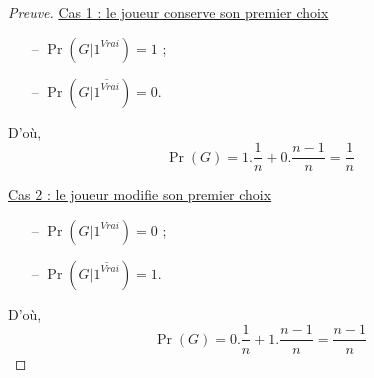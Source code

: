 \begin{proof}[Preuve]
\underline{Cas 1 : le joueur conserve son premier choix}
\begin{itemize}
\item[--] $\Pr(G|1^{Vrai}) = 1 $ ;
\item[--] $\Pr(G|\overline{1^{Vrai}}) = 0$.
\end{itemize}
D'où, 
$$ \Pr(G) = 1.\frac{1}{n}
	+ 0.\frac{n-1}{n} = \frac{1}{n}$$

\underline{Cas 2 : le joueur modifie son premier choix}
\begin{itemize}
\item[--] $\Pr(G|1^{Vrai}) = 0$ ;
\item[--] $\Pr(G|\overline{1^{Vrai}}) = 1$.
\end{itemize}
D'où, 
$$ \Pr(G) = 0.\frac{1}{n}
	+ 1.\frac{n-1}{n} = \frac{n-1}{n}$$
\end{proof}